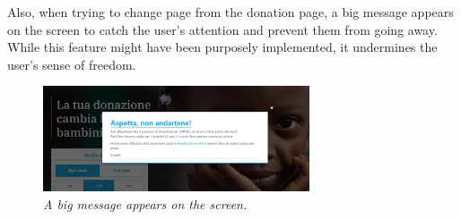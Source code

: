 Also, when trying to change page from the donation page, a big message appears on the screen to catch the user's attention and prevent them from going away. While this feature might have been purposely implemented, it undermines the user's sense of freedom.
\begin{figure}[!h]
	\begin{center}
		\includegraphics[width=0.7\textwidth]{FinalScores7.jpg}
		\captionsetup{font=small}
		\caption{\textit{A big message appears on the screen.}}
	\end{center}
\end{figure}







